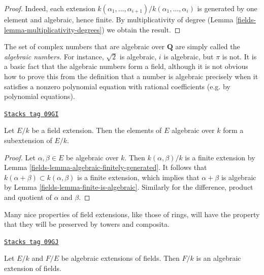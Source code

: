 \begin{proof}

Indeed, each extension
$k(\alpha_{1}, \ldots, \alpha_{i+1})/k(\alpha_1, \ldots, \alpha_{i})$
is generated by one element and algebraic, hence finite.
By multiplicativity of degree (Lemma \ref{fields-lemma-multiplicativity-degrees})
we obtain the result.
\end{proof}

The set of complex numbers that are algebraic over $\mathbf{Q}$ are simply
called the {\it algebraic numbers.} For instance, $\sqrt{2}$ is algebraic,
$i$ is algebraic, but $\pi$ is not.
It is a basic fact that the algebraic numbers form a field, although it is not
obvious how to prove this from the definition that a number is algebraic
precisely when it satisfies a nonzero polynomial equation with rational
coefficients (e.g. by polynomial equations).

\begin{lemma}
\label{fields-lemma-algebraic-elements}
\href{https://stacks.math.columbia.edu/tag/09GI}{\texttt{Stacks tag 09GI}}

Let $E/k$ be a field extension. Then the elements of $E$ algebraic over $k$
form a subextension of $E/k$.
\end{lemma}

\begin{proof}

Let $\alpha, \beta \in E$ be algebraic over $k$. Then $k(\alpha, \beta)/k$
is a finite extension by Lemma \ref{fields-lemma-algebraic-finitely-generated}.
It follows that $k(\alpha + \beta) \subset k(\alpha, \beta)$ is a finite
extension, which implies that $\alpha + \beta$ is algebraic by
Lemma \ref{fields-lemma-finite-is-algebraic}. Similarly for the difference,
product and quotient of $\alpha$ and $\beta$.
\end{proof}

Many nice properties of field extensions, like those of rings, will have the
property that they will be preserved by towers and composita.

\begin{lemma}
\label{fields-lemma-algebraic-permanence}
\href{https://stacks.math.columbia.edu/tag/09GJ}{\texttt{Stacks tag 09GJ}}

Let $E/k$ and $F/E$ be algebraic extensions of fields. Then $F/k$ is an
algebraic extension of fields.
\end{lemma}

